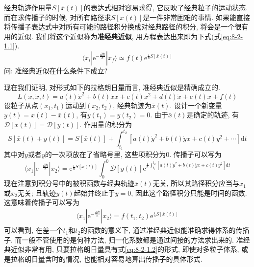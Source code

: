         经典轨迹作用量$S[\bar x(t)]$的表达式相对容易求得, 它反映了经典粒子的运动状态. 而在求传播子的时候, 对所有路径求$S[x(t)]$是一件非常困难的事情. 如果能直接将传播子表达式中对所有可能的路径积分换成对经典路径的积分, 将会是一个很有用的近似. 我们将这个近似称为\textbf{准经典近似}, 用方程表达出来即为下式(式\ref{eq:8-2-1.1}). 
        \begin{equation}\label{eq:8-2-1.1}
            \langle x_i | \mathrm{e}^{-\frac {\mathrm{i}\hat{H}t}{\hslash}} | x_f \rangle \simeq f(t) \mathrm{e}^{ \frac{\mathrm{i}}{\hslash} S[\bar x(t)] } 
        \end{equation}
        问: 准经典近似在什么条件下成立?

        \splitline

        现在我们证明, 对形式如下的拉格朗日量而言, 准经典近似是精确成立的. 
        \begin{equation}\label{eq:8-2-1.2}
            L(x, \dot x, t) = a(t)\dot x^2 + b(t) \dot x x + c(t) x^2 + d(t) \dot x + e(t) x + f(t)
        \end{equation}
        设粒子从点$(x_1, t_1)$运动到$(x_2, t_2)$, 经典轨迹为$\bar x(t)$. 设计一个新变量$y(t) = x(t) - \bar x(t)$, 有$y(t_1) = y(t_2) = 0$. 由于$\bar x(t)$是确定的轨迹, 有$\mathcal{D}[x(t)] = \mathcal{D}[y(t)]$. 作用量的积分为
        \begin{equation}
            S[\bar x(t) + y(t)] = S[\bar x(t)] + \int_{t_1}^{t_2} [a(t)\dot y^2 + b(t) \dot y x + c(t) y^2 + \cdots] \mathrm{d}t
        \end{equation}
        其中对$y$或者$\dot y$的一次项放在了省略号里, 这些项积分为0. 传播子可以写为
        \begin{equation}
            \langle x_1 | \mathrm{e}^{-\frac {\mathrm{i}\hat{H}t}{\hslash}} | x_2 \rangle = \mathrm{e}^{ \frac{\mathrm{i}}{\hslash} S[\bar x(t)] } \int_0^0 \mathcal{D}[y(t)] \mathrm{e}^{ \frac{\mathrm{i}}{\hslash} \int_{t_1}^{t_2} [a(t)\dot y^2 + b(t) \dot y x + c(t) y^2] \mathrm{d}t }
        \end{equation}
        现在注意到积分号中的被积函数与经典轨迹$\bar x(t)$无关, 所以其路径积分应当与$x_1$或$x_2$无关; 且轨迹$y(t)$起始并终止于$y=0$, 因此这个路径积分只能是时间的函数. 这意味着传播子可以写为
        \begin{equation}\begin{aligned}
            \langle x_1 | \mathrm{e}^{-\frac {\mathrm{i}\hat{H}t}{\hslash}} | x_2 \rangle = f(t_1, t_2) \mathrm{e}^{ \frac{\mathrm{i}}{\hslash} S[\bar x(t)] } 
        \end{aligned}\end{equation}
        可以看到, 在差一个$t_1$和$t_2$的函数的意义下, 通过准经典近似能准确求得体系的传播子. 而一般不管使用的是何种方法, 归一化系数都是通过间接的方法求出来的. 准经典近似非常有用, 只要拉格朗日量具有式\ref{eq:8-2-1.2}的形式, 即使对多粒子体系, 或是拉格朗日量含时的情况, 也能相对容易地算出传播子的具体形式. 

